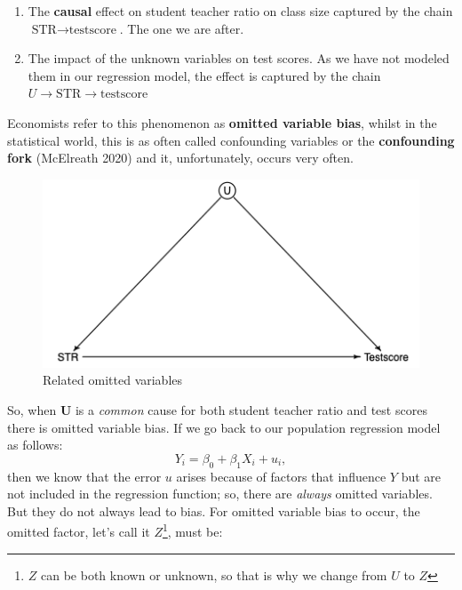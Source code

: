 \documentclass[
]{book}
\providecommand{\tightlist}{%
  \setlength{\itemsep}{0pt}\setlength{\parskip}{0pt}}
\begin{document}
\begin{enumerate}
\def\labelenumi{\arabic{enumi})}
\tightlist
\item
  The \textbf{causal} effect on student teacher ratio on class size captured by the chain \(\text{STR} \longrightarrow \text{testscore}\). The one we are after.
\item
  The impact of the unknown variables on test scores. As we have not modeled them in our regression model, the effect is captured by the chain \(U \longrightarrow \text{STR} \longrightarrow \text{testscore}\)
\end{enumerate}

Economists refer to this phenomenon as \textbf{omitted variable bias}, whilst in the statistical world, this is as often called confounding variables or the \textbf{confounding fork} (McElreath 2020) and it, unfortunately, occurs very often.

\begin{figure}

{\centering \includegraphics[width=600px]{./figures/Unobshet} 

}

\caption{Related omitted variables}\label{fig:unobshet}
\end{figure}

So, when \textbf{U} is a \emph{common} cause for both student teacher ratio and test scores there is omitted variable bias. If we go back to our population regression model as follows:
\begin{equation}
Y_i = \beta_0 + \beta_1 X_i + u_i,
\end{equation}
then we know that the error \(u\) arises because of factors that influence \(Y\) but are not included in the regression function; so, there are \emph{always} omitted variables. But they do not always lead to bias. For omitted variable bias to occur, the omitted factor, let's call it \(Z\)\footnote{\(Z\) can be both known or unknown, so that is why we change from \(U\) to \(Z\)}, must be:
\end{document}

